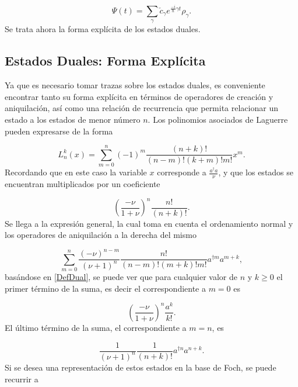 \documentclass[a4paper,10pt]{report}
\begin{document}
\begin{equation}
\Psi(t) = \sum_\gamma \check{c}_\gamma e^{\frac{-i}{\hbar} \gamma t} \rho_{\gamma}.
\end{equation} Se trata ahora la forma explícita de los estados duales.

\subsection{Estados Duales: Forma Explícita}

Ya que es necesario tomar trazas sobre los estados duales, es conveniente encontrar tanto su forma explícita en términos de operadores de creación y aniquilación, así como una relación de recurrencia que permita relacionar un estado a los estados de menor número $n$. Los polinomios asociados de Laguerre pueden expresarse de la forma\cite{ArfkenMM}

\begin{equation}\label{DefLaguerre}
L_n^k(x) = \sum_{m=0}^n (-1)^m \frac{(n+k)!}{(n-m)!(k+m)!m!} x^m.
\end{equation} Recordando que en este caso la variable $x$ corresponde a $\frac{a^\dagger a}{\nu}$, y que los estados se encuentran multiplicados por un coeficiente

\begin{equation}
(\frac{-\nu}{1+\nu})^n \frac{n!}{(n+k)!}.
\end{equation}Se llega a la expresión general, la cual toma en cuenta el ordenamiento normal y los operadores de aniquilación a la derecha del mismo

\begin{equation}\label{DefDual}
\sum_{m=0}^n \frac{(-\nu)^{n-m}}{(\nu+1)^n} \frac{n!}{(n-m)!(m+k)!m!} a^{\dagger m}a^{m+k},
\end{equation}basándose en \eqref{DefDual}, se puede ver que para cualquier valor de $n$ y $k \geq 0$ el primer término de la suma, es decir el correspondiente a $m=0$ es

\begin{equation}
(\frac{-\nu}{1+\nu})^n \frac{a^k}{k!}.
\end{equation} El último término de la suma, el correspondiente a $m=n$, es

\begin{equation}
\frac{1}{(\nu+1)^n} \frac{1}{(n+k)!} a^{\dagger n}a^{n+k}.
\end{equation}Si se desea una representación de estos estados en la base de Foch, se puede recurrir a
\end{document}

